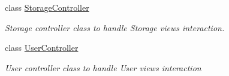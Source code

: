 \begin{DoxyCompactItemize}
class \hyperlink{class_p_c_builder_m_v_c_1_1_controllers_1_1_storage_controller}{Storage\+Controller}
\begin{DoxyCompactList}\small\item\em Storage controller class to handle Storage views interaction. \end{DoxyCompactList}\item 
class \hyperlink{class_p_c_builder_m_v_c_1_1_controllers_1_1_user_controller}{User\+Controller}
\begin{DoxyCompactList}\small\item\em User controller class to handle User views interaction \end{DoxyCompactList}\end{DoxyCompactItemize}
